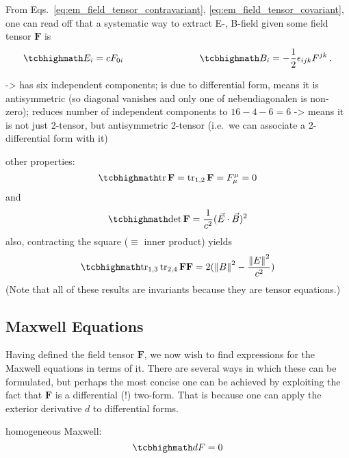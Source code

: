 \documentclass[../relativity_main.tex]{subfiles}
\begin{document}
From Eqs.~\eqref{eq:em_field_tensor_contravariant}, \eqref{eq:em_field_tensor_covariant}, one can read off that a systematic way to extract E-, B-field given some field tensor $\mathbf{F}$ is
\begin{equation}
	\eqbox{
		E_i = c F_{0 i}
	}
	\manyqquad
	\eqbox{
		B_i = - \frac{1}{2} \epsilon_{ijk} F^{jk}
	}
	\, .
\end{equation}


-> has six independent components; is due to differential form, means it is antisymmetric (so diagonal vanishes and only one of nebendiagonalen is non-zero); reduces number of independent components to $16 - 4 - 6 = 6$ -> means it is not just 2-tensor, but antisymmetric 2-tensor (i.e.~we can associate a 2-differential form with it)


other properties:
\begin{equation}
	\eqbox{
		\tr \mathbf{F} = \tr_{1, 2} \mathbf{F} = F^\mu_\mu = 0
	}
\end{equation}
and
\begin{equation}
	\eqbox{
		\det \mathbf{F} = \frac{1}{c^2} (\vec{E} \cdot \vec{B})^2
	}
\end{equation}
also, contracting the square ($\equiv$ inner product) yields
\begin{equation}
	\eqbox{
		\tr_{1, 3} \tr_{2, 4} \mathbf{F} \mathbf{F} = 2 (\norm{B}^2 - \frac{\norm{E}^2}{c^2})
	}
\end{equation}
(Note that all of these results are invariants because they are tensor equations.)



		\subsection{Maxwell Equations}
Having defined the field tensor $\mathbf{F}$, we now wish to find expressions for the Maxwell equations in terms of it. There are several ways in which these can be formulated, but perhaps the most concise one can be achieved by exploiting the fact that $\mathbf{F}$ is a differential (!) two-form. That is because one can apply the exterior derivative $d$ to differential forms.



homogeneous Maxwell:
\begin{equation}
	\eqbox{
		dF = 0
	}
\end{equation}
\end{document}
